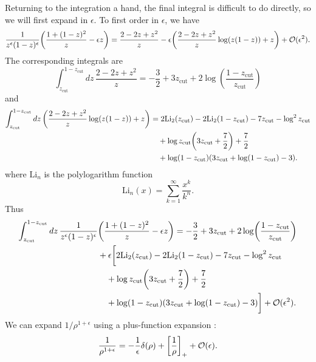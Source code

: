 \documentclass[11pt,twoside,reqno]{amsart}
\theoremstyle{plain}
\theoremstyle{remark}
\theoremstyle{definition}
\theoremstyle{remark}
\theoremstyle{definition}
\theoremstyle{definition}
\newcommand{\cO}{\mathcal{O}}
\newcommand{\zcut}{z_\mathrm{cut}}
\newcommand{\Li}{\mathrm{Li}}
\begin{document}
	Returning to the integration a hand, the final integral is difficult to do directly, so we will first expand in $\epsilon$. To first order in $\epsilon$, we have
	\begin{equation}
		\frac{1}{z^\epsilon (1 - z)^\epsilon} \qty(\frac{1 + (1 - z)^2}{z} - \epsilon z) = \frac{2 - 2z + z^2}{z} - \epsilon \qty(\frac{2 - 2z + z^2}{z}\log(z(1 - z)) + z) + \cO(\epsilon^2).
	\end{equation}
	The corresponding integrals are
	\begin{equation}
		\int_{\zcut}^{1 - \zcut} dz\, \frac{2 - 2z + z^2}{z} = -\frac{3}{2} + 3\zcut + 2\log(\frac{1 - \zcut}{\zcut})
	\end{equation}
	and
	\begin{equation}
	\begin{aligned}
		\int_{\zcut}^{1 - \zcut} dz\, \qty(\frac{2 - 2z + z^2}{z}\log(z(1 - z)) + z) &= 2 \mathrm{Li}_2(\zcut) -2 \mathrm{Li}_2(1-\zcut) - 7 \zcut - \log^2\zcut \\
			&\quad + \log \zcut\qty(3\zcut + \frac{7}{2})  +\frac{7}{2}  \\
			&\quad +\log (1-\zcut) (3 \zcut + \log (1-\zcut )-3).
	\end{aligned}
	\end{equation}
	where $\Li_n$ is the polylogarithm function
	\begin{equation}
		\Li_n(x) = \sum_{k = 1}^\infty \frac{x^k}{k^n}.
	\end{equation}
	Thus
	\begin{equation}
	\begin{aligned}
		\int_{\zcut}^{1 - \zcut} dz\,\frac{1}{z^\epsilon (1 - z)^\epsilon} &\qty(\frac{1 + (1 - z)^2}{z} - \epsilon z) = -\frac{3}{2} + 3\zcut + 2\log(\frac{1 - \zcut}{\zcut}) \\
			&+ \epsilon \bigg[ 2 \mathrm{Li}_2(\zcut) -2 \mathrm{Li}_2(1-\zcut) - 7 \zcut - \log^2\zcut \\
			&\quad + \log \zcut\qty(3\zcut + \frac{7}{2}) + \frac{7}{2}  \\
			&\quad +\log (1-\zcut) (3 \zcut + \log (1-\zcut )-3) \bigg] + \cO(\epsilon^2).
	\end{aligned}
	\end{equation}
	We can expand $1/\rho^{1 + \epsilon}$ using a plus-function expansion \cite{lazopoulos_qcd_2007}:
	\begin{equation}
		\frac{1}{\rho^{1 + \epsilon}} = -\frac{1}{\epsilon}\delta(\rho) + \qty[\frac{1}{\rho}]_+ + \cO(\epsilon).
	\end{equation}
\end{document}
